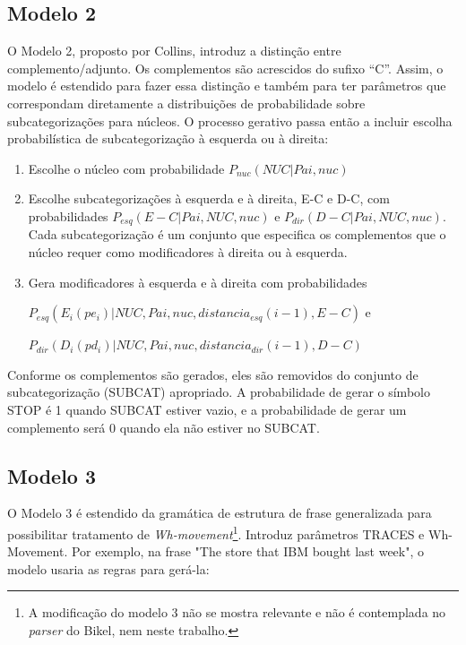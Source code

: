 \subsection{Modelo 2}
\label{sub:modelo2}

O Modelo 2, proposto por Collins, introduz a distinção entre complemento/adjunto. Os complementos  são acrescidos do sufixo ``C''. Assim, o modelo é estendido para fazer essa distinção e também para ter parâmetros que correspondam diretamente a distribuições de probabilidade sobre subcategorizações para núcleos.
O processo gerativo passa então a incluir escolha probabilística de subcategorização à esquerda ou à direita:

\begin{enumerate}
  \item Escolhe o núcleo com probabilidade $P_{nuc}(NUC|Pai, nuc)$
  \item Escolhe subcategorizações à esquerda e à direita, E-C e D-C, com probabilidades $P_{esq}(E-C|Pai,NUC, nuc)$ e $P_{dir}(D-C|Pai,NUC, nuc)$. Cada subcategorização é um conjunto que especifica os complementos que o núcleo requer como modificadores à direita ou à esquerda.
  \item Gera modificadores à esquerda e à direita com probabilidades

$P_{esq}(E_i(pe_i)|NUC, Pai, nuc, distancia_{esq}(i - 1),E - C)$ e

$P_{dir}(D_i(pd_i)|NUC, Pai, nuc, distancia_{dir}(i - 1),D - C)$

\end{enumerate}


Conforme os complementos são gerados, eles são removidos do conjunto de subcategorização (SUBCAT) apropriado. A probabilidade de gerar o símbolo STOP é 1 quando SUBCAT estiver vazio, e a probabilidade de gerar um complemento será 0 quando ela não estiver no SUBCAT.



\subsection{Modelo 3}
\label{sub:modelo3}


O Modelo 3 é estendido da gramática de estrutura de frase generalizada para possibilitar tratamento de \emph{Wh-movement}\footnote{A modificação do modelo 3 não se mostra relevante e não é contemplada no \emph{parser} do Bikel, nem neste trabalho.}. Introduz parâmetros TRACES e Wh-Movement. Por exemplo, na frase "The store that IBM bought last week", o modelo usaria as regras para gerá-la:

